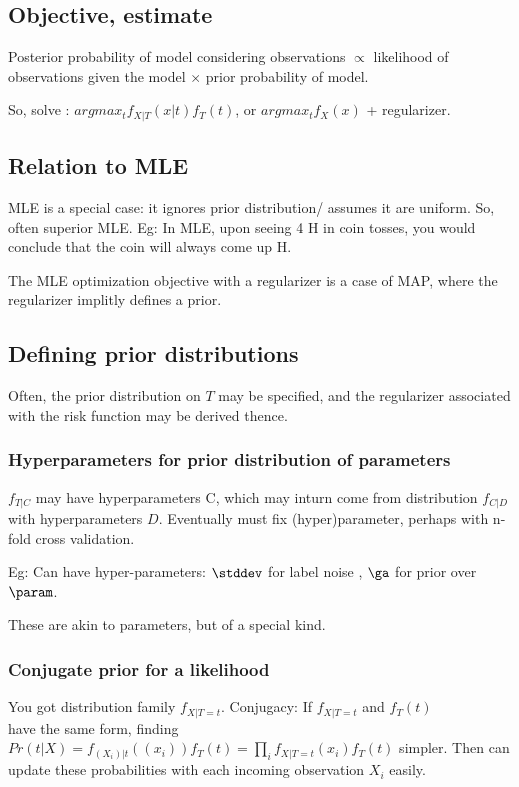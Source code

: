 \documentclass[oneside, article]{memoir}
\begin{document}
\subsection{Objective, estimate}
Posterior probability of model considering observations $\propto$ likelihood of observations given the model $\times$ prior probability of model.

So, solve : $argmax_{t} f_{X|T}(x|t)f_T(t)$, or $argmax_{t} f_X(x)$ + regularizer.

\subsection{Relation to MLE}
MLE is a special case: it ignores prior distribution/ assumes it are uniform. So, often superior MLE. Eg: In MLE, upon seeing 4 H in coin tosses, you would conclude that the coin will always come up H.

The MLE optimization objective with a regularizer is a case of MAP, where the regularizer implitly defines a prior.

\subsection{Defining prior distributions}
Often, the prior distribution on $T$ may be specified, and the regularizer associated with the risk function may be derived thence.

\subsubsection{Hyperparameters for prior distribution of parameters}
$f_{T|C}$ may have hyperparameters C, which may inturn come from distribution $f_{C|D}$ with hyperparameters $D$. Eventually must fix (hyper)parameter, perhaps with n-fold cross validation.

Eg: Can have hyper-parameters: $\stddev$ for label noise , $\ga$ for prior over $\param$.

These are akin to parameters, but of a special kind.

\subsubsection{Conjugate prior for a likelihood}
You got distribution family $f_{X|T=t}$. Conjugacy: If $f_{X|T=t}$ and $f_T(t)$\\
 have the same form, finding $Pr(t|X) = f_{(X_{i})|t}((x_i))f_T(t) =  \prod_{i} f_{X|T=t}(x_i)f_T(t)$ simpler. Then can update these probabilities with each incoming observation $X_{i}$ easily.
\end{document}
